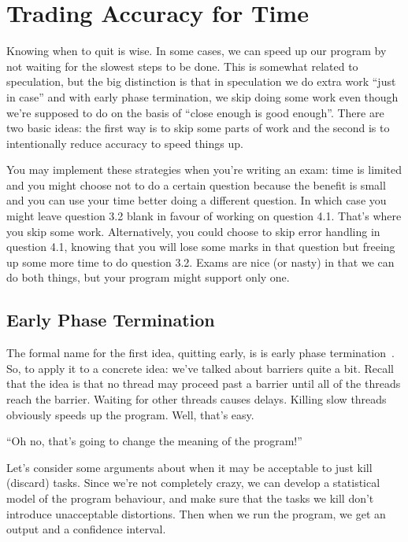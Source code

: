 \documentclass[a4paper]{report}
\begin{document}
\section*{Trading Accuracy for Time}

Knowing when to quit is wise. In some cases, we can speed up our program by not waiting for the slowest steps to be done. This is somewhat related to speculation, but the big distinction is that in speculation we do extra work ``just in case'' and with early phase termination, we skip doing some work even though we're supposed to do on the basis of ``close enough is good enough''.  There are two basic ideas: the first way is to skip some parts of work and the second is to intentionally reduce accuracy to speed things up. 

You may implement these strategies when you're writing an exam: time is limited and you might choose not to do a certain question because the benefit is small and you can use your time better doing a different question. In which case you might leave question 3.2 blank in favour of working on question 4.1. That's where you skip some work. Alternatively, you could choose to skip error handling in question 4.1, knowing that you will lose some marks in that question but freeing up some more time to do question 3.2. Exams are nice (or nasty) in that we can do both things, but your program might support only one.

\subsection*{Early Phase Termination}

The formal name for the first idea, quitting early, is is early phase
termination~\cite{Rinard:2007:EarlyPhaseTermination}. So, to apply it to a concrete idea: we've talked about barriers quite a bit. Recall that the idea is that
no thread may proceed past a barrier until all of the threads
reach the barrier. Waiting for other threads causes delays. 
Killing slow threads obviously speeds up the program. Well, that's easy.

\begin{center}
``Oh no, that's going to change the meaning of the program!''
\end{center}

Let's consider some arguments about when it may be acceptable to just
kill (discard) tasks. Since we're not completely crazy, we can develop
a statistical model of the program behaviour, and make sure that the
tasks we kill don't introduce unacceptable distortions. Then when we
run the program, we get an output and a confidence interval.
\end{document}
